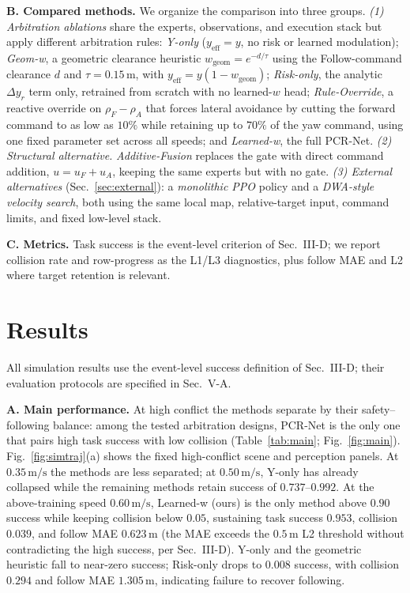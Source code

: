 \documentclass[letterpaper, 10 pt, conference]{ieeeconf}
\newcommand{\uF}{u_{F}}
\newcommand{\uA}{u_{A}}
\newcommand{\yeff}{y_{\mathrm{eff}}}
\newcommand{\rFdir}{\rho_F}
\newcommand{\rAdir}{\rho_A}
\newcommand{\dyrdir}{\Delta y_r}
\newcommand{\msec}{\,\mathrm{m/s}}
\begin{document}
\textbf{B. Compared methods.}
We organize the comparison into three groups.
\emph{(1) Arbitration ablations} share the experts, observations, and
execution stack but apply different arbitration rules:
\emph{Y-only} ($\yeff=y$, no risk or learned modulation);
\emph{Geom-w}, a geometric clearance heuristic
$w_{\mathrm{geom}}=e^{-d/\tau}$ using the Follow-command clearance $d$ and
$\tau=0.15\,\mathrm{m}$, with $\yeff=y(1-w_{\mathrm{geom}})$;
\emph{Risk-only}, the analytic $\dyrdir$ term only, retrained from
scratch with no learned-$w$ head; \emph{Rule-Override}, a reactive
override on $\rFdir-\rAdir$ that forces lateral avoidance by cutting the forward
command to as low as $10\%$ while retaining up to $70\%$ of the yaw
command, using one fixed parameter set across all speeds; and
\emph{Learned-w}, the full PCR-Net.
\emph{(2) Structural alternative.} \emph{Additive-Fusion} replaces the
gate with direct command addition, $u=\uF+\uA$, keeping the same experts
but with no gate.
\emph{(3) External alternatives} (Sec.~\ref{sec:external}): a
\emph{monolithic PPO} policy and a \emph{DWA-style velocity search},
both using the same local map, relative-target input, command limits, and
fixed low-level stack.

\textbf{C. Metrics.}
Task success is the event-level criterion of Sec.~III-D; we report collision
rate and row-progress as the L1/L3 diagnostics, plus follow MAE and L2
where target retention is relevant.

\section{Results}
\label{sec:results}
All simulation results use the event-level success definition of
Sec.~III-D; their evaluation protocols are specified in Sec.~V-A.

\textbf{A. Main performance.}
At high conflict the methods separate by their safety--following balance:
among the tested arbitration designs, PCR-Net is the only one that pairs high
task success with low collision (Table~\ref{tab:main}; Fig.~\ref{fig:main}).
Fig.~\ref{fig:simtraj}(a) shows the fixed high-conflict scene and perception
panels. At $0.35\msec$ the methods are less separated; at $0.50\msec$,
Y-only has already collapsed while the remaining methods retain success of
$0.737$--$0.992$. At the above-training speed $0.60\msec$, Learned-w (ours) is the only method above
$0.90$ success while keeping collision below $0.05$, sustaining
task success $0.953$, collision $0.039$, and
follow MAE $0.623\,\mathrm{m}$ (the MAE exceeds the $0.5\,\mathrm{m}$ L2
threshold without contradicting the high success, per Sec.~III-D). Y-only
and the geometric heuristic fall to near-zero success; Risk-only drops to
$0.008$ success, with collision $0.294$ and follow MAE $1.305\,\mathrm{m}$,
indicating failure to recover following.
\end{document}
